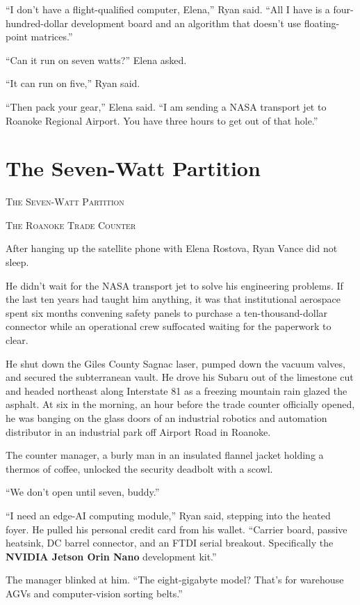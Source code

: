 \documentclass[12pt,twoside,openright]{book}
\newcommand{\sceneheader}[1]{%
  \par\vspace{1.8em}%
  {\noindent\centering\scshape\large #1\par}%
  \vspace{1.0em}%
  \noindent%
}
\begin{document}
``I don't have a flight-qualified computer, Elena,'' Ryan said. ``All I
have is a four-hundred-dollar development board and an algorithm that
doesn't use floating-point matrices.''

``Can it run on seven watts?'' Elena asked.

``It can run on five,'' Ryan said.

``Then pack your gear,'' Elena said. ``I am sending a NASA transport jet
to Roanoke Regional Airport. You have three hours to get out of that
hole.''

\chapter{The Seven-Watt Partition}
\sceneheader{The Seven-Watt Partition}

\sceneheader{The Roanoke Trade
Counter}

After hanging up the satellite phone with Elena Rostova, Ryan Vance did
not sleep.

He didn't wait for the NASA transport jet to solve his engineering
problems. If the last ten years had taught him anything, it was that
institutional aerospace spent six months convening safety panels to
purchase a ten-thousand-dollar connector while an operational crew
suffocated waiting for the paperwork to clear.

He shut down the Giles County Sagnac laser, pumped down the vacuum
valves, and secured the subterranean vault. He drove his Subaru out of
the limestone cut and headed northeast along Interstate 81 as a freezing
mountain rain glazed the asphalt. At six in the morning, an hour before
the trade counter officially opened, he was banging on the glass doors
of an industrial robotics and automation distributor in an industrial
park off Airport Road in Roanoke.

The counter manager, a burly man in an insulated flannel jacket holding
a thermos of coffee, unlocked the security deadbolt with a scowl.

``We don't open until seven, buddy.''

``I need an edge-AI computing module,'' Ryan said, stepping into the
heated foyer. He pulled his personal credit card from his wallet.
``Carrier board, passive heatsink, DC barrel connector, and an FTDI
serial breakout. Specifically the \textbf{NVIDIA Jetson Orin Nano}
development kit.''

The manager blinked at him. ``The eight-gigabyte model? That's for
warehouse AGVs and computer-vision sorting belts.''
\end{document}
